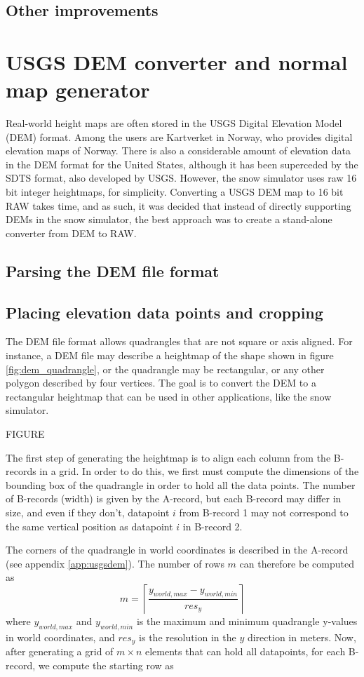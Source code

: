 \subsection{Other improvements}

\section{USGS DEM converter and normal map generator}
Real-world height maps are often stored in the USGS Digital Elevation Model (DEM) format. Among the users are Kartverket in Norway, who provides digital elevation maps of Norway. There is also a considerable amount of elevation data in the DEM format for the United States, although it has been superceded by the SDTS format, also developed by USGS\cite{wiki_usgsdem}. However, the snow simulator uses raw 16 bit integer heightmaps, for simplicity. Converting a USGS DEM map to 16 bit RAW takes time, and as such, it was decided that instead of directly supporting DEMs in the snow simulator, the best approach was to create a stand-alone converter from DEM to RAW.

\subsection{Parsing the DEM file format}

\subsection{Placing elevation data points and cropping}
The DEM file format allows quadrangles that are not square or axis aligned. For instance, a DEM file may describe a heightmap of the shape shown in figure \ref{fig:dem_quadrangle}, or the quadrangle may be rectangular, or any other polygon described by four vertices. The goal is to convert the DEM to a rectangular heightmap that can be used in other applications, like the snow simulator. 

FIGURE

The first step of generating the heightmap is to align each column from the B-records in a grid. In order to do this, we first must compute the dimensions of the bounding box of the quadrangle in order to hold all the data points. The number of B-records (width) is given by the A-record, but each B-record may differ in size, and even if they don't, datapoint $i$ from B-record 1 may not correspond to the same vertical position as datapoint $i$ in B-record 2. 

The corners of the quadrangle in world coordinates is described in the A-record (see appendix \ref{app:usgsdem}). The number of rows $m$ can therefore be computed as
$$
m = \left\lceil\frac{y_{world,max}-y_{world,min}}{res_y}\right\rceil
$$
where $y_{world,max}$ and $y_{world,min}$ is the maximum and minimum quadrangle y-values in world coordinates, and $res_y$ is the resolution in the $y$ direction in meters. Now, after generating a grid of $m\times n$ elements that can hold all datapoints, for each B-record, we compute the starting row as

